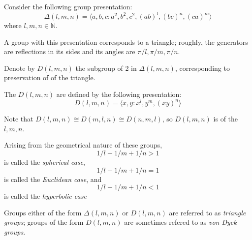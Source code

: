 \documentclass[12pt]{article}
\begin{document}
Consider the following group presentation:
$$\Delta(l,m,n)=\langle a,b,c:a^2,b^2,c^2,(ab)^l,(bc)^n,(ca)^m\rangle$$
where $l,m,n\in\mathbb{N}$.

A group with this presentation corresponds to a triangle; roughly, the generators are reflections in its sides and its angles are $\pi/l,\pi/m,\pi/n$.

Denote by $D(l,m,n)$ the subgroup of  2 in $\Delta(l,m,n)$, corresponding to preservation of  of the triangle.

The $D(l,m,n)$ are defined by the following presentation:
$$D(l,m,n)=\langle x,y:x^l,y^m,(xy)^n\rangle$$

Note that $D(l,m,n)\cong D(m,l,n)\cong D(n,m,l)$, so $D(l,m,n)$ is  of the $l,m,n$.

Arising from the geometrical nature of these groups, $$1/l+1/m+1/n>1$$is called the \emph{spherical case},$$1/l+1/m+1/n=1$$is called the \emph{Euclidean case}, and$$1/l+1/m+1/n<1$$is called the \emph{hyperbolic case}

Groups either of the form $\Delta(l,m,n)$ or $D(l,m,n)$ are referred to as \emph{triangle groups}; groups of the form $D(l,m,n)$ are sometimes refered to as \emph{von Dyck groups}.
\end{document}

